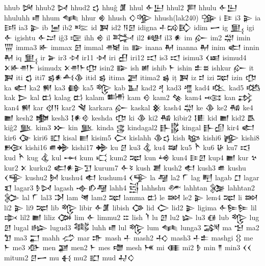  hhub  𒄽   
 hhub2  𒄸   
 hhud2  𒌓   
 hhuĝ  𒂠   
 hhul  𒅆𒌨    
 hhul2  𒄾   
 hhulu  𒅆𒌨    
 hhuluhh  𒈛   
 hhum  𒈝   
 hhur  𒄯   
 hhush  𒄭𒄊    
 hhush(lak240)  𒍽   
 i  𒄿   
 i3  𒉌   
 ia  𒅀   
 ia3  𒉌   
 ib  𒅁   
 ib2  𒌈   
 id  𒀉   
 id2  𒀀𒇉    
 idigna  𒈦𒄘𒃼    
 idim  𒅂   
 ig  𒅅   
 igi  𒅆   
 igishtu  𒅆𒁺    
 iĝ3  𒉘   
 ihh  𒄴   
 il  𒅋   
 il2  𒅍   
 il3  𒀭   
 im  𒅎   
 im2  𒁽   
 imin  𒅓   
 imma3  𒅊   
 immax  𒇋   
 immal  𒉥   
 in  𒅔   
 inana  𒈹   
 inanna  𒈹   
 inim  𒅗   
 innin  𒈹   
 iq  𒅅   
 ir  𒅕   
 ir3  𒀴   
 ir11  𒀵   
 iri  𒌷   
 iri12  𒀊   
 is3  𒀊   
 isimu3  𒌋𒀜    
 isimud4  𒉽𒅊𒉣𒈨    
 isimudx  𒉽𒉣𒈨𒂡    
 isin2  𒅔   
 ish  𒅖   
 ishib  𒈨   
 ishin  𒉺𒊺    
 ishkur  𒅎   
 it  𒀉   
 iti  𒌚   
 iti7  𒌗𒀭𒋀𒆠    
 itid  𒌗   
 itima  𒃟   
 itima2  𒌖   
 iṭ  𒀉   
 iz  𒄑   
 izi  𒉈   
 izin  𒂡   
 ka  𒅗   
 ka2  𒆍   
 ka3  𒂵   
 ka5  𒈜   
 kab  𒆏   
 kad2  𒆐   
 kad3  𒆑   
 kad4  𒆒   
 kad5  𒆓   
 kak  𒆕   
 kal  𒆗   
 kalag  𒆗   
 kalam  𒌦   
 kam  𒄰   
 kam2  𒆚   
 kam4  𒆛   
 kan  𒃶   
 kan4  𒆍   
 kar  𒋼𒀀    
 kar2  𒃸   
 karkara  𒅎   
 kaskal  𒆜   
 kash4  𒁽   
 ke  𒆠   
 ke2  𒄀   
 ke4  𒆤   
 kesh2  𒆟   
 kesh3  𒋙𒀭𒄲    
 keshda  𒂡   
 ki  𒆠   
 ki2  𒄀   
 kibir2  𒋙𒀾    
 kid  𒆤   
 kid2  𒋺   
 kiĝ2  𒆥   
 kim3  𒁍   
 kin  𒆥   
 kinda  𒃱   
 kindagal2  𒃲𒌵    
 kingal  𒃲𒌺    
 kir4  𒅗   
 kir6  𒀘   
 kiri6  𒊬   
 kisal  𒆦   
 kisim5  𒆨   
 kislahh  𒆠𒌓    
 kish  𒆧   
 kishi6  𒊾   
 kishi8  𒁞   
 kishi16  𒌑𒄉    
 kishi17  𒄉   
 ku  𒆪   
 ku3  𒆬   
 ku4  𒆭   
 ku5  𒋻   
 ku6  𒄩   
 ku7  𒆯   
 kud  𒋻   
 kug  𒆬   
 kul  𒆰   
 kum  𒄣   
 kum2  𒉈   
 kun  𒆲   
 kun4  𒄿𒇻    
 kup4  𒆤   
 kur  𒆳   
 kur2  𒉽   
 kurku2  𒅗𒀭𒉌𒋛    
 kurum7  𒅆𒂟    
 kush  𒋢   
 kush2  𒊨   
 kush3  𒌑   
 kushu  𒌋𒊊    
 kushu2  𒆵   
 kushu4  𒊨   
 kushum4  𒌋𒊊    
 la  𒆷   
 la2  𒇲   
 lag  𒋃   
 lagab  𒆸   
 lagar  𒇬   
 lagar3  𒊩𒄸    
 lagash  𒉢𒁓𒆷    
 lahh4  𒁻   
 lahhshu  𒇱   
 lahhtan  𒉴   
 lahhtan2  𒉶   
 lal  𒇲   
 lal3  𒋭   
 lam  𒇴   
 lam2  𒉈   
 lamma  𒆗   
 le  𒇷   
 le2  𒉌   
 lem4  𒉈   
 li  𒇷   
 li2  𒉌   
 li9  𒉈   
 lib  𒈜   
 libir  𒅆𒂠    
 libish  𒀚   
 lid  𒀖   
 lid2  𒉌   
 ligima  𒅆𒌉𒌉    
 lil  𒇸   
 lil2  𒆤   
 liliz  𒀗   
 lim  𒅆   
 limmu2  𒇹   
 lish  𒇺   
 lu  𒇻   
 lu2  𒇽   
 lu3  𒈖   
 lub  𒈜   
 lug  𒇻   
 lugal  𒈗   
 lugud3  𒈟   
 luhh  𒈛   
 lul  𒈜   
 lum  𒈝   
 lunga3  𒋋   
 ma  𒈠   
 ma2  𒈣   
 ma3  𒂷   
 mahh  𒈤   
 mar  𒈥   
 mash  𒈦   
 mash2  𒈧   
 mash3  𒈦𒉺    
 mashgi  𒌐   
 me  𒈨   
 me3  𒀞   
 men  𒃞   
 men2  𒈨   
 mes  𒈩   
 mesh  𒎌   
 mi  𒈪   
 mi2  𒊩   
 min  𒈫   
 min3  𒌋𒌋    
 mitum2  𒆪𒅂    
 mu  𒈬   
 mu2  𒊬   
 mud  𒄷𒄭    
